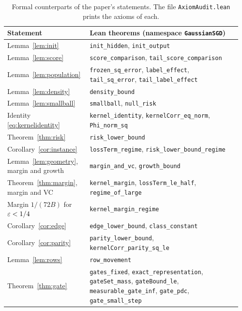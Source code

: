 \documentclass[11pt,letterpaper,pmlr,twoside]{jmlr}
\newcommand{\lean}[1]{\texttt{#1}}
\begin{document}
\begin{table}[htbp]
\centering\small
\begin{tabular}{@{}>{\raggedright\arraybackslash}p{0.33\linewidth}>{\raggedright\arraybackslash}p{0.63\linewidth}@{}}
\toprule
Statement & Lean theorems (namespace \lean{GaussianSGD})\\
\midrule
Lemma~\ref{lem:init} & \lean{init\_hidden}, \lean{init\_output}\\
Lemma~\ref{lem:score} & \lean{score\_comparison}, \lean{tail\_score\_comparison}\\
Lemma~\ref{lem:population} & \lean{frozen\_sq\_error}, \lean{label\_effect}, \lean{tail\_sq\_error}, \lean{tail\_label\_effect}\\
Lemma~\ref{lem:density} & \lean{density\_bound}\\
Lemma~\ref{lem:smallball} & \lean{smallball}, \lean{null\_risk}\\
Identity \eqref{eq:kernelidentity} & \lean{kernel\_identity}, \lean{kernelCorr\_eq\_norm}, \lean{Phi\_norm\_sq}\\
Theorem~\ref{thm:risk} & \lean{risk\_lower\_bound}\\
Corollary~\ref{cor:instance} & \lean{lossTerm\_regime}, \lean{risk\_lower\_bound\_regime}\\
Lemma~\ref{lem:geometry}, margin and growth & \lean{margin\_and\_vc}, \lean{growth\_bound}\\
Theorem~\ref{thm:margin}, margin and VC & \lean{kernel\_margin}, \lean{lossTerm\_le\_half}, \lean{regime\_of\_large}\\
Margin $1/(72B)$ for $\varepsilon<1/4$ & \lean{kernel\_margin\_regime}\\
Corollary~\ref{cor:edge} & \lean{edge\_lower\_bound}, \lean{class\_constant}\\
Corollary~\ref{cor:parity} & \lean{parity\_lower\_bound}, \lean{kernelCorr\_parity\_sq\_le}\\
Lemma~\ref{lem:rows} & \lean{row\_movement}\\
Theorem~\ref{thm:gate} & \lean{gates\_fixed}, \lean{exact\_representation}, \lean{gateSet\_mass}, \lean{gateBound\_le}, \lean{measurable\_gate\_inf}, \lean{gate\_pdc}, \lean{gate\_small\_step}\\
\bottomrule
\end{tabular}
\caption{Formal counterparts of the paper's statements. The file \lean{AxiomAudit.lean} prints the axioms of each.}
\label{tab:lean}
\end{table}
\end{document}
